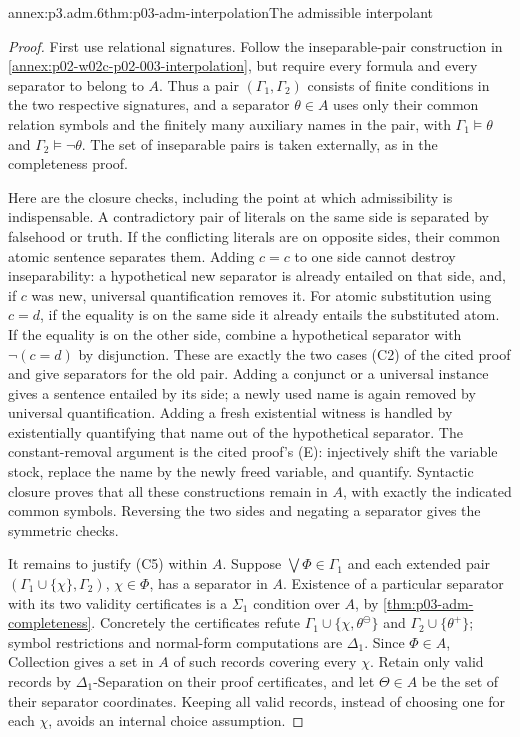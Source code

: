 \begin{annexitem}{annex:p3.adm.6}{thm:p03-adm-interpolation}{The admissible interpolant}
\begin{proof}
First use relational signatures. Follow the inseparable-pair construction
in \cref{annex:p02-w02c-p02-003-interpolation}, but require every formula
and every separator to belong to \(A\). Thus a pair
\((\Gamma_1,\Gamma_2)\) consists of finite conditions in the two respective
signatures, and a separator \(\theta\in A\) uses only their common
relation symbols and the finitely many auxiliary names in the pair,
with \(\Gamma_1\models\theta\) and
\(\Gamma_2\models\neg\theta\). The set of inseparable pairs is taken
externally, as in the completeness proof.

Here are the closure checks, including the point at which admissibility
is indispensable. A contradictory pair of literals on the same side
is separated by falsehood or truth. If the conflicting literals are
on opposite sides, their common atomic sentence separates them. Adding
\(c=c\) to one side cannot destroy inseparability: a hypothetical new
separator is already entailed on that side, and, if \(c\) was new,
universal quantification removes it. For atomic substitution using
\(c=d\), if the equality is on the same side it already entails the
substituted atom. If the equality is on the other side, combine a
hypothetical separator with \(\neg(c=d)\) by disjunction. These are
exactly the two cases (C2) of the cited proof and give separators for
the old pair. Adding a conjunct or a universal instance gives a sentence
entailed by its side; a newly used name is again removed by universal
quantification. Adding a fresh existential witness is handled by
existentially quantifying that name out of the hypothetical separator.
The constant-removal argument is the cited proof's (E): injectively
shift the variable stock, replace the name by the newly freed variable,
and quantify. Syntactic closure proves that all these constructions
remain in \(A\), with exactly the indicated common symbols. Reversing
the two sides and negating a separator gives the symmetric checks.

It remains to justify (C5) within \(A\). Suppose
\(\bigvee\Phi\in\Gamma_1\) and each extended pair
\((\Gamma_1\cup\{\chi\},\Gamma_2)\), \(\chi\in\Phi\), has a separator
in \(A\). Existence of a particular separator with its two validity
certificates is a \(\Sigma_1\) condition over \(A\), by
\cref{thm:p03-adm-completeness}. Concretely the certificates refute
\(\Gamma_1\cup\{\chi,\theta^{\ominus}\}\) and
\(\Gamma_2\cup\{\theta^+\}\); symbol restrictions and normal-form
computations are \(\Delta_1\). Since \(\Phi\in A\), Collection gives a
set in \(A\) of such records covering every \(\chi\). Retain only valid
records by \(\Delta_1\)-Separation on their proof certificates, and let
\(\Theta\in A\) be the set of their separator coordinates. Keeping all
valid records, instead of choosing one for each \(\chi\), avoids an
internal choice assumption.


\end{proof}
\end{annexitem}
